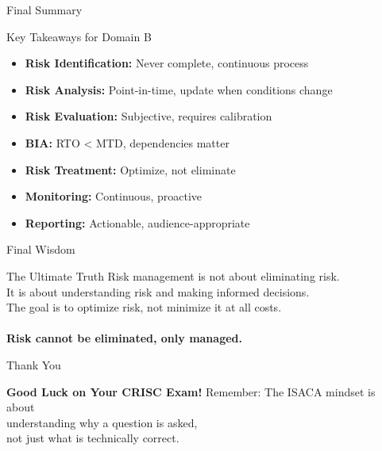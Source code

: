\documentclass{beamer}
\begin{document}
			\begin{frame}{Final Summary}
				\begin{block}{Key Takeaways for Domain B}
					\begin{itemize}
						\item \textbf{Risk Identification:} Never complete, continuous process
						\item \textbf{Risk Analysis:} Point-in-time, update when conditions change
						\item \textbf{Risk Evaluation:} Subjective, requires calibration
						\item \textbf{BIA:} RTO < MTD, dependencies matter
						\item \textbf{Risk Treatment:} Optimize, not eliminate
						\item \textbf{Monitoring:} Continuous, proactive
						\item \textbf{Reporting:} Actionable, audience-appropriate
					\end{itemize}
				\end{block}
			\end{frame}
			
			\begin{frame}{Final Wisdom}
				\begin{alertblock}{The Ultimate Truth}
					Risk management is not about eliminating risk.\\
					It is about understanding risk and making informed decisions.\\
					The goal is to optimize risk, not minimize it at all costs.\\
					\\
					\textbf{Risk cannot be eliminated, only managed.}
				\end{alertblock}
			\end{frame}
			
			\begin{frame}{Thank You}
				\begin{center}
					\Huge
					\textbf{Good Luck on Your CRISC Exam!}
					\vspace{1cm}
					\normalsize
					Remember: The ISACA mindset is about\\
					understanding why a question is asked,\\
					not just what is technically correct.
				\end{center}
			\end{frame}
			
		
\end{document}
